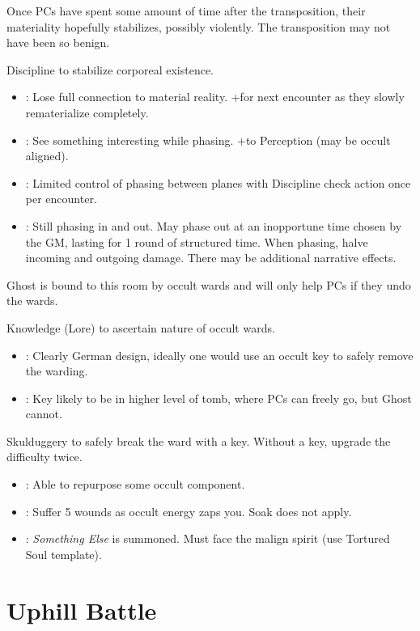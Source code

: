\documentclass{book}
\newcommand{\df}{\DifficultyDie }
\newcommand{\stb}{\SetbackDie }
\newcommand{\ch}{\ChallengeDie }
\newcommand{\bbb}{\BoostDie }
\begin{document}
\begin{multicols}{2}
    Once PCs have spent some amount of time after the transposition, their materiality hopefully stabilizes, possibly violently.  The transposition may not have been so benign.

\ch\df Discipline to stabilize corporeal existence.
    \begin{itemize}
        \item \Failure: Lose full connection to material reality.  +\stb for next encounter as they slowly rematerialize completely.
        \item \Advantage: See something interesting while phasing.  +\bbb to Perception (may be occult aligned).
        \item \Triumph: Limited control of phasing between planes with \df\df\df Discipline check action once per encounter.
        \item \Despair: Still phasing in and out.  May phase out at an inopportune time chosen by the GM, lasting for 1 round of structured time.  When phasing, halve incoming and outgoing damage.  There may be additional narrative effects.
    \end{itemize}

Ghost is bound to this room by occult wards and will only help PCs if they undo the wards.

    \df\df Knowledge (Lore) to ascertain nature of occult wards.
    \begin{itemize}
        \item \Success: Clearly German design, ideally one would use an occult key to safely remove the warding.
        \item \Advantage: Key likely to be in higher level of tomb, where PCs can freely go, but Ghost cannot.
    \end{itemize}

\df\df\stb\stb Skulduggery to safely break the ward with a key.  Without a key, upgrade the difficulty twice.
    \begin{itemize}
        \item \Advantage: Able to repurpose some occult component.
        \item \Failure: Suffer 5 wounds as occult energy zaps you.  Soak does not apply.
        \item \Despair: \emph{Something Else} is summoned.  Must face the malign spirit (use Tortured Soul template).
    \end{itemize}

\section{Uphill Battle}


\end{multicols}
\end{document}
